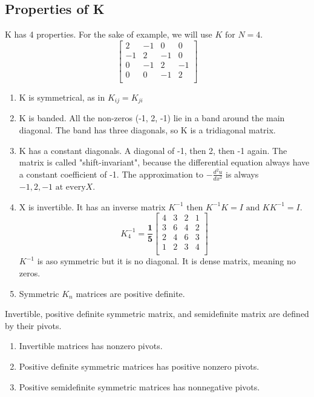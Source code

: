 \subsection{Properties of K}
K has 4 properties. For the sake of example, we will use \(K \text{ for } N = 4\). 
\[
    \begin{bmatrix}
        2 & -1 & 0 & 0  \\
        -1 & 2 & -1 & 0  \\
        0 &  -1 & 2 & -1  \\
        0 & 0 & -1 & 2  \\
    \end{bmatrix}
\]
\begin{enumerate}
    \item K is symmetrical, as in \(K_{ij} = K_{ji}\)
    \item K is banded. All the non-zeros (-1, 2, -1) lie in a band around the main diagonal. The band has three diagonals, so K is a tridiagonal matrix. 
    \item K has a constant diagonals. A diagonal of -1, then 2, then -1 again. The matrix is called "shift-invariant", because the differential equation always have a constant coefficient of -1. The approximation to \(-\frac{d^2 u}{dx^2}\)  is always \(-1, 2, -1 \text{ at every} X\).
    \item X is invertible. It has an inverse matrix \(K^{-1} \text{ then } K^{-1}K = I \text{ and } KK^{-1} = I\). 
    \[
        K_4^{-1} = \bm{\frac{1}{5}} \begin{bmatrix}
            4 & 3 & 2 & 1  \\
            3 & 6 & 4 & 2  \\
            2 & 4 & 6 & 3 \\
            1 & 2 & 3 & 4  \\
        \end{bmatrix}  
    \]  
    \(K^{-1} \) is aso symmetric but it is no diagonal. It is dense matrix, meaning no zeros. 
    \item Symmetric \(K_n\) matrices are positive definite.  
\end{enumerate}
Invertible, positive definite symmetric matrix, and semidefinite matrix are defined by their pivots.
\begin{enumerate}
    \item Invertible matrices has nonzero pivots.
    \item Positive definite symmetric matrices has positive nonzero pivots.
    \item Positive semidefinite symmetric matrices has nonnegative pivots.
\end{enumerate}

